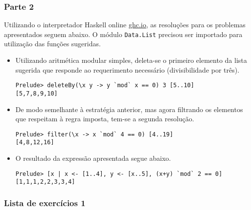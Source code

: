 \documentclass{../sftex/sftex}
\begin{document}
\subsubsection*{Parte 2}
Utilizando o interpretador Haskell online \href{http://ghc.io}{ghc.io}, as
resoluções para os problemas apresentados seguem abaixo. O módulo
\verb!Data.List! precisou ser importado para utilização das funções sugeridas.
\begin{itemize}
    \item Utilizando aritmética modular simples, deleta-se o primeiro elemento
    da lista sugerida que responde ao requerimento necessário (divisibilidade
    por três).
    \begin{verbatim}Prelude> deleteBy(\x y -> y `mod` x == 0) 3 [5..10]
[5,7,8,9,10]\end{verbatim}

    \item De modo semelhante à estratégia anterior, mas agora filtrando os
    elementos que respeitam à regra imposta, tem-se a segunda resolução.
    \begin{verbatim}Prelude> filter(\x -> x `mod` 4 == 0) [4..19]
[4,8,12,16]\end{verbatim}

    \item O resultado da expressão apresentada segue abaixo.
    \begin{verbatim}Prelude> [x | x <- [1..4], y <- [x..5], (x+y) `mod` 2 == 0]
[1,1,1,2,2,3,3,4]\end{verbatim}
\end{itemize}

\newpage

\subsubsection*{Lista de exercícios 1}
\end{document}
